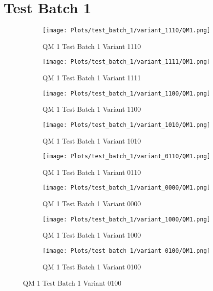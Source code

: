\documentclass{DissertateFigs}
\begin{document}
\section{Test Batch 1}
\begin{figure}[t!]
    \begin{subfigure}{0.47\textwidth}
    \texttt{[image: Plots/test\_batch\_1/variant\_1110/QM1.png]}
    \caption{QM 1 Test Batch 1 Variant 1110}
    \end{subfigure}
    \begin{subfigure}{0.47\textwidth}
    \texttt{[image: Plots/test\_batch\_1/variant\_1111/QM1.png]}
    \caption{QM 1 Test Batch 1 Variant 1111}
    \end{subfigure}

\medskip

    \begin{subfigure}{0.47\textwidth}
    \texttt{[image: Plots/test\_batch\_1/variant\_1100/QM1.png]}
    \caption{QM 1 Test Batch 1 Variant 1100}
    \end{subfigure}
    \begin{subfigure}{0.47\textwidth}
    \texttt{[image: Plots/test\_batch\_1/variant\_1010/QM1.png]}
    \caption{QM 1 Test Batch 1 Variant 1010}
    \end{subfigure}

\medskip

    \begin{subfigure}{0.47\textwidth}
    \texttt{[image: Plots/test\_batch\_1/variant\_0110/QM1.png]}
    \caption{QM 1 Test Batch 1 Variant 0110}
    \end{subfigure}
    \begin{subfigure}{0.47\textwidth}
    \texttt{[image: Plots/test\_batch\_1/variant\_0000/QM1.png]}
    \caption{QM 1 Test Batch 1 Variant 0000}
    \end{subfigure}

\medskip

    \begin{subfigure}{0.47\textwidth}
    \texttt{[image: Plots/test\_batch\_1/variant\_1000/QM1.png]}
    \caption{QM 1 Test Batch 1 Variant 1000}
    \end{subfigure}
    \begin{subfigure}{0.47\textwidth}
    \texttt{[image: Plots/test\_batch\_1/variant\_0100/QM1.png]}
    \caption{QM 1 Test Batch 1 Variant 0100}
    \end{subfigure}


\end{figure}
\end{document}
